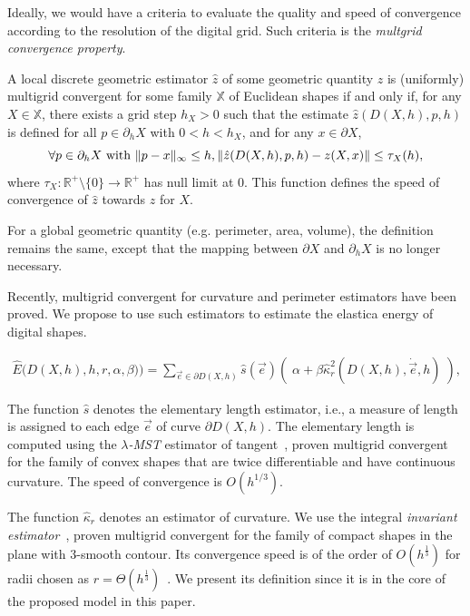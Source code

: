 \documentclass[smallextended]{svjour3}
\DeclarePairedDelimiter\norm{\lVert}{\rVert}%
\begin{document}
Ideally, we would have a criteria to evaluate the quality and speed of convergence according to the resolution of the digital grid. Such criteria is the \emph{multgrid convergence property}.


\begin{definition}
  A local discrete geometric estimator $\hat{z}$ of some geometric
  quantity $z$ is (uniformly) multigrid convergent for some family $\mathbb{X}$ of Euclidean shapes if
  and only if, for any $X \in \mathbb{X}$, there exists a grid step
  $h_X>0$ such that the estimate $\hat{z}(D(X,h), p,h)$ is
  defined for all $p \in \partial_hX$ with $ 0 < h < h_X$, and
  for any $x \in \partial X$,
  \begin{equation*}
    \forall p \in  \partial_hX \text{ with } \norm{ p - x }_{\infty} \leq h, \norm{ \hat{z}(D(X,h),p,h) - z(X,x)} \leq \tau_{X}(h),			
  \end{equation*}
  where $\tau_{X}:\mathbb{R}^{+}\setminus\{0\} \rightarrow
  \mathbb{R}^{+}$ has null limit at $0$. This function defines the
  speed of convergence of $\hat{z}$ towards $z$ for $X$.
\end{definition}
	
For a global geometric quantity (e.g. perimeter, area, volume), the definition remains the same, except that the mapping
between $\partial X$ and $\partial_h X$ is no longer necessary.

Recently, multigrid convergent for curvature and perimeter estimators have been proved. We propose to use such estimators to estimate the elastica energy of digital shapes. 

\begin{align}
	\hat{E}\big( D(X,h),h,r,\alpha,\beta) \big) = \sum_{\vec{e} \in \partial D(X,h)}{ \hat{s}(\vec{e})\left(\; \alpha + \beta \hat{\kappa}_{r}^2(D(X,h),\dot{\vec{e}},h) \; \right)},
	\label{eq:digital-energy}
\end{align}

The function $\hat{s}$ denotes the elementary length estimator, i.e., a measure of length is assigned to each edge $\vec{e}$ of curve $\partial D(X,h)$. The elementary length is computed using the \emph{$\lambda$-MST} estimator of tangent~\cite{lachaud07tangent,lachaud06hdr}, proven multigrid convergent for the family of convex shapes that are twice differentiable and have continuous curvature. The speed of convergence is $O(h^{1/3})$.

The function $\hat{\kappa} _r$ denotes an estimator of curvature. We use the integral \emph{invariant estimator}~\cite{coeurjolly13integral}, proven multigrid convergent for the family of compact shapes in the plane with $3$-smooth contour. Its convergence speed is of the order of $O(h^{\frac{1}{3}})$ for radii chosen as $r=\Theta (h^{\frac{1}{3}})$~\cite{lachaud2017robust}. We present its definition since it is in the core of the proposed model in this paper.
\end{document}
